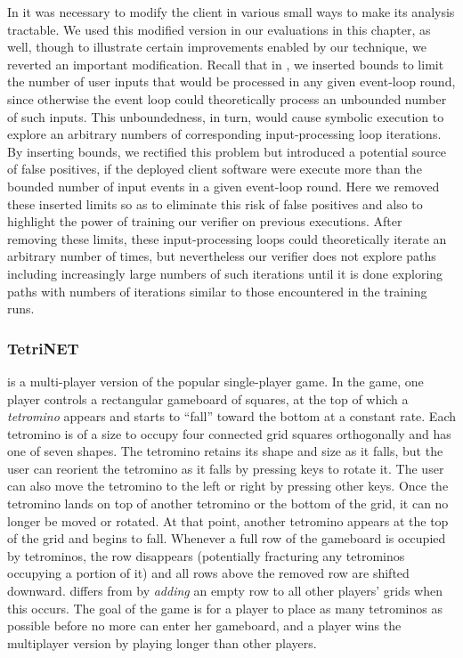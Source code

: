 In  it was necessary to modify the \xpilot client in
various small ways to make its analysis tractable.
We used this modified
version in our evaluations in this chapter, as well, though to illustrate
certain improvements enabled by our technique, we reverted an
important modification. Recall that in , we  
inserted bounds to limit the number of user inputs that would be
processed in any given event-loop round, since otherwise the event
loop could theoretically process an unbounded number of such inputs.
This unboundedness, in turn, would cause symbolic execution to explore
an arbitrary numbers of corresponding input-processing loop iterations.
By inserting bounds, we rectified this problem but
introduced a potential source of false positives, if the deployed
client software were execute more than the bounded number of
input events in a given event-loop round.  Here 
we removed these inserted limits so as to eliminate this risk of false
positives and also to highlight the power of training our verifier on
previous executions.  After removing these limits, these
input-processing loops could theoretically iterate an arbitrary number
of times, but nevertheless our verifier does not explore paths
including increasingly large numbers of such iterations until it is
done exploring paths with numbers of iterations similar to those
encountered in the training runs.  

\subsubsection{TetriNET}
\tetrinet is a multi-player version of the popular single-player
\tetris game.  In the \tetris game, one player controls a rectangular
gameboard of squares, at the top of which a \textit{tetromino} appears
and starts to ``fall'' toward the bottom at a constant rate.  Each
tetromino is of a size to occupy four connected grid squares
orthogonally and has one of seven shapes.  The tetromino retains its
shape and size as it falls, but the user can reorient the tetromino as
it falls by pressing keys to rotate it.  The user can also move the
tetromino to the left or right by pressing other keys.  Once the
tetromino lands on top of another tetromino or the bottom of the grid,
it can no longer be moved or rotated.  At that point, another
tetromino appears at the top of the grid and begins to fall.  Whenever
a full row of the gameboard is occupied by tetrominos, the row
disappears (potentially fracturing any tetrominos occupying a portion
of it) and all rows above the removed row are shifted downward.
\tetrinet differs from \tetris by \textit{adding} an empty row to all
other players' grids when this occurs.  The goal of the game is for a
player to place as many tetrominos as possible before no more can
enter her gameboard, and a player wins the multiplayer version by
playing longer than other players.

